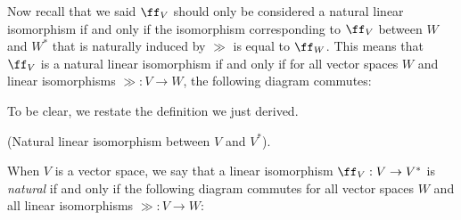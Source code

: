 \begin{deriv}
	\begin{center}
	\end{center}
	
	Now recall that we said $\ff_V$ should only be considered a natural linear isomorphism if and only if the isomorphism corresponding to $\ff_V$ between $W$ and $W^*$ that is naturally induced by $\gg$ is equal to $\ff_W$. This means that $\ff_V$ is a natural linear isomorphism if and only if for all vector spaces $W$ and linear isomorphisms $\gg:V \rightarrow W$, the following diagram commutes:
	
	\begin{center}
	\end{center}
\end{deriv}

To be clear, we restate the definition we just derived.

\begin{defn}
	(Natural linear isomorphism between $V$ and $V^*$).
	
	When $V$ is a vector space, we say that a linear isomorphism $\ff_V:V \rightarrow V^*$ is \textit{natural} if and only if the following diagram commutes for all vector spaces $W$ and all linear isomorphisms $\gg:V \rightarrow W$:
	
	\begin{center}
	\end{center}
\end{defn}

